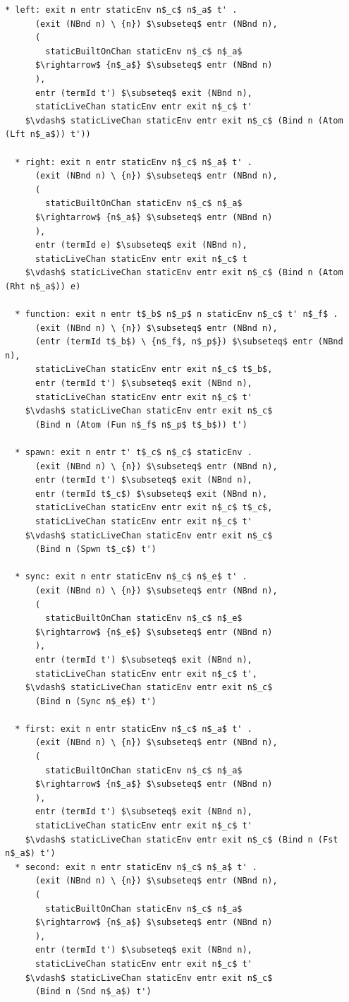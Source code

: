 \documentclass[letterpaper, 11pt]{extarticle}
\begin{document}
\begin{lstlisting}[language=logic, mathescape]
  * left: exit n entr staticEnv n$_c$ n$_a$ t' . 
      (exit (NBnd n) \ {n}) $\subseteq$ entr (NBnd n),
      (
        staticBuiltOnChan staticEnv n$_c$ n$_a$
      $\rightarrow$ {n$_a$} $\subseteq$ entr (NBnd n)
      ),
      entr (termId t') $\subseteq$ exit (NBnd n),
      staticLiveChan staticEnv entr exit n$_c$ t'
    $\vdash$ staticLiveChan staticEnv entr exit n$_c$ (Bind n (Atom (Lft n$_a$)) t'))

  * right: exit n entr staticEnv n$_c$ n$_a$ t' . 
      (exit (NBnd n) \ {n}) $\subseteq$ entr (NBnd n),
      (
        staticBuiltOnChan staticEnv n$_c$ n$_a$
      $\rightarrow$ {n$_a$} $\subseteq$ entr (NBnd n)
      ),
      entr (termId e) $\subseteq$ exit (NBnd n),
      staticLiveChan staticEnv entr exit n$_c$ t
    $\vdash$ staticLiveChan staticEnv entr exit n$_c$ (Bind n (Atom (Rht n$_a$)) e)

  * function: exit n entr t$_b$ n$_p$ n staticEnv n$_c$ t' n$_f$ . 
      (exit (NBnd n) \ {n}) $\subseteq$ entr (NBnd n),
      (entr (termId t$_b$) \ {n$_f$, n$_p$}) $\subseteq$ entr (NBnd n),
      staticLiveChan staticEnv entr exit n$_c$ t$_b$,
      entr (termId t') $\subseteq$ exit (NBnd n),
      staticLiveChan staticEnv entr exit n$_c$ t'
    $\vdash$ staticLiveChan staticEnv entr exit n$_c$
      (Bind n (Atom (Fun n$_f$ n$_p$ t$_b$)) t')

  * spawn: exit n entr t' t$_c$ n$_c$ staticEnv .
      (exit (NBnd n) \ {n}) $\subseteq$ entr (NBnd n),
      entr (termId t') $\subseteq$ exit (NBnd n),
      entr (termId t$_c$) $\subseteq$ exit (NBnd n),
      staticLiveChan staticEnv entr exit n$_c$ t$_c$,
      staticLiveChan staticEnv entr exit n$_c$ t'
    $\vdash$ staticLiveChan staticEnv entr exit n$_c$
      (Bind n (Spwn t$_c$) t')

  * sync: exit n entr staticEnv n$_c$ n$_e$ t' .
      (exit (NBnd n) \ {n}) $\subseteq$ entr (NBnd n),
      (
        staticBuiltOnChan staticEnv n$_c$ n$_e$
      $\rightarrow$ {n$_e$} $\subseteq$ entr (NBnd n)
      ),
      entr (termId t') $\subseteq$ exit (NBnd n),
      staticLiveChan staticEnv entr exit n$_c$ t',
    $\vdash$ staticLiveChan staticEnv entr exit n$_c$
      (Bind n (Sync n$_e$) t')

  * first: exit n entr staticEnv n$_c$ n$_a$ t' .
      (exit (NBnd n) \ {n}) $\subseteq$ entr (NBnd n),
      (
        staticBuiltOnChan staticEnv n$_c$ n$_a$
      $\rightarrow$ {n$_a$} $\subseteq$ entr (NBnd n)
      ),
      entr (termId t') $\subseteq$ exit (NBnd n),
      staticLiveChan staticEnv entr exit n$_c$ t'
    $\vdash$ staticLiveChan staticEnv entr exit n$_c$ (Bind n (Fst n$_a$) t')
  * second: exit n entr staticEnv n$_c$ n$_a$ t' .
      (exit (NBnd n) \ {n}) $\subseteq$ entr (NBnd n),
      (
        staticBuiltOnChan staticEnv n$_c$ n$_a$
      $\rightarrow$ {n$_a$} $\subseteq$ entr (NBnd n)
      ),
      entr (termId t') $\subseteq$ exit (NBnd n),
      staticLiveChan staticEnv entr exit n$_c$ t'
    $\vdash$ staticLiveChan staticEnv entr exit n$_c$
      (Bind n (Snd n$_a$) t')


\end{lstlisting}
\end{document}
